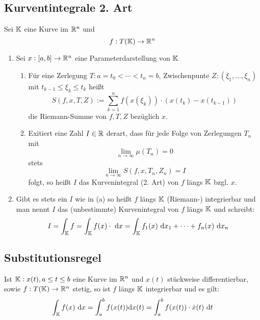 \subsection{Kurventintegrale 2. Art}
Sei $\mathbb{K}$ eine Kurve im $\mathbb{R}^n$ und
\begin{equation*}
    f: T(\mathbb{K}) \rightarrow \mathbb{R}^n
\end{equation*}
\begin{enumerate}[label= (\alph*)]
    \item Sei $x: [a,b]  \rightarrow \mathbb{R}^n$ eine Parameterdarstellung von $\mathbb{K}$
        \begin{enumerate}[label = (\roman*)]
            \item Für eine Zerlegung $T: a = t_0 < \cdots < t_n = b$,
                Zwischenpunte $Z: (\xi_1, \ldots, \xi_n)$ mit
                $t_{k-1} \leq \xi_k \leq t_k$
                heißt
                \begin{equation*}
                    S(f,x,T,Z) := \sum_{k=1}^n f(x(\xi_k)) \cdot (x(t_k) - x(t_{k-1}))
                \end{equation*}
                die Riemann-Summe von $f, T, Z$ bezüglich $x$.
            \item Exitiert eine Zahl $I \in \mathbb{R}$ derart, dass für jede Folge von
                Zerlegungen $T_n$ mit
                \begin{equation*}
                    \lim_{n \rightarrow \infty} \mu(T_n) = 0
                \end{equation*}
                stets
                \begin{equation*}
                    \lim_{n \rightarrow \infty} S(f,x,T_n, Z_n) = I
                \end{equation*}
                folgt, so heißt $I$ das Kurvenintegral (2. Art) von
                $f$ längs $\mathbb{K}$ bzgl. $x$.
        \end{enumerate}
    \item Gibt es stets ein $I$ wie in (a) so heißt $f$ längs $\mathbb{K}$ (Riemann-)
        integrierbar und man nennt $I$ das (unbestimmte) Kurvenintegral von $f$
        längs $\mathbb{K}$ und schreibt:
        \begin{equation*}
            I = \int_{\mathbb{K}} f = \int_{\mathbb{K}} f(x) \cdot \text{ d}x = \int_{\mathbb{K}} f_1(x) \text{ d}x_1 + \cdots
            + f_n(x) \text{ d}x_n
        \end{equation*}
\end{enumerate}

\subsection{Substitutionsregel}
Ist $\mathbb{K}: x(t), a \leq t \leq b$ eine Kurve im $\mathbb{R}^n$ und $x(t)$ stückweise
differentierbar, sowie $f: T(\mathbb{K}) \rightarrow \mathbb{R}^n$ stetig, so ist $f$ längs
$\mathbb{K}$ integrierbar und es gilt:
\begin{equation*}
    \int_{\mathbb{K}} f(x) \text{ d}x = \int_a^b f(x(t)) \text{d}x(t) = \int_a^b f(x(t)) \cdot
    \dot{x}(t) \text{ d}t
\end{equation*}

